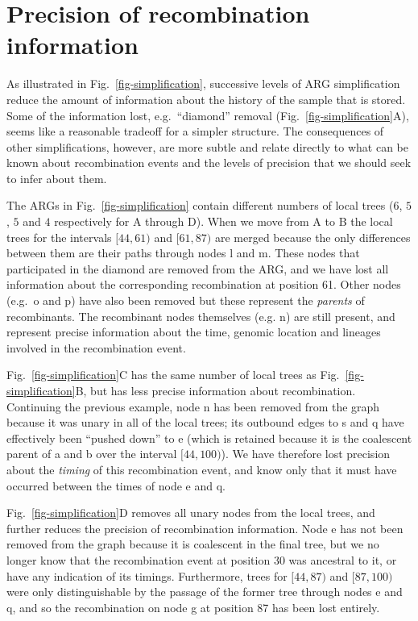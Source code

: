 \documentclass[9pt,twocolumn,twoside]{gsajnl}
\newcommand{\noderef}[1]{\textsf{#1}}
\begin{document}
\section{Precision of recombination information}
\label{sec-precision}
As illustrated in Fig.~\ref{fig-simplification}, successive levels
of ARG simplification reduce the amount of information about the
history of the sample that is stored. Some of the information lost,
e.g.\ ``diamond'' removal (Fig.~\ref{fig-simplification}A),
seems like a reasonable tradeoff for a simpler structure.
The consequences of other simplifications, however, are
more subtle and relate directly to what can be known about
recombination events and the levels of precision that
we should seek to infer about them.

The ARGs in Fig.~\ref{fig-simplification} contain different
numbers of local trees ($6$, $5$, $5$ and $4$ respectively for A through
D). When we move from A to B the local trees
for the intervals $[44,61)$ and $[61,87)$ are merged because
the only differences between them are their paths through
nodes \noderef{l} and \noderef{m}. These nodes that participated
in the diamond are removed from the ARG, and we have lost
all information about the corresponding recombination at
position 61. Other nodes (e.g.\ \noderef{o} and \noderef{p})
have also been removed but these represent the \emph{parents}
of recombinants. The recombinant nodes themselves
(e.g. \noderef{n}) are still present, and represent precise
information about the time, genomic location and
lineages involved in the recombination event.

Fig.~\ref{fig-simplification}C has the same number of local trees
as Fig.~\ref{fig-simplification}B, but has less precise information
about recombination. Continuing the previous example, node
\noderef{n} has been removed from the graph because it was unary
in all of the local trees; its outbound edges to \noderef{s}
and \noderef{q} have effectively been ``pushed down''
to \noderef{e} (which is retained because it is the coalescent
parent of \noderef{a} and \noderef{b} over the interval
$[44, 100)$). We
have therefore lost precision about
the \emph{timing} of this recombination event, and know only
that it must have occurred between the times of node \noderef{e}
and \noderef{q}.

Fig.~\ref{fig-simplification}D removes all unary nodes from the
local trees, and further reduces the precision of
recombination information. Node \noderef{e} has not been
removed from the graph because it is coalescent in the
final tree, but we no longer know that the recombination
event at position 30 was ancestral to it, or have
any indication of its timings. Furthermore,
trees for $[44, 87)$ and $[87, 100)$ were only distinguishable
by the passage of the former tree through nodes \noderef{e}
and \noderef{q}, and so the recombination on node \noderef{g}
at position 87 has been lost entirely.
\end{document}
